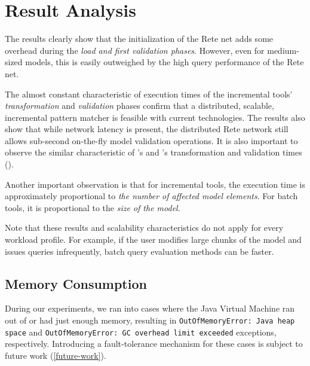 \section{Result Analysis}

The results clearly show that the initialization of the Rete net adds some overhead during the \emph{load and first validation phases}. However, even for medium-sized models, this is easily outweighed by the high query performance of the Rete net.

The almost constant characteristic of execution times of the incremental tools' \emph{transformation} and \emph{validation} phases confirm that a distributed, scalable, incremental pattern matcher is feasible with current technologies. The results also show that while network latency is present, the distributed Rete network still allows sub-second on-the-fly model validation operations. It is also important to observe the similar characteristic of \iqd{}'s and \eiq{}'s transformation and validation times ().

Another important observation is that for incremental tools, the execution time is approximately proportional to \emph{the number of affected model elements}. For batch tools, it is proportional to the \emph{size of the model}. 

Note that these results and scalability characteristics do not apply for every workload profile. For example, if the user modifies large chunks of the model and issues queries infrequently, batch query evaluation methods can be faster. 


\subsection{Memory Consumption}

During our experiments, we ran into cases where the Java Virtual Machine ran out of or had just enough memory, resulting in \texttt{OutOfMemoryError: Java heap space} and \texttt{OutOfMemoryError: GC overhead limit exceeded} exceptions, respectively. Introducing a fault-tolerance mechanism for these cases is subject to future work (\autoref{future-work}).

